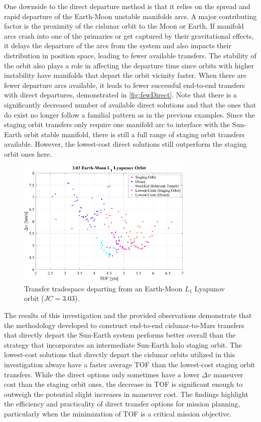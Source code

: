 One downside to the direct departure method is that it relies on the spread and rapid departure of
the Earth-Moon unstable manifolds arcs. A major contributing factor is the proximity of the
cislunar orbit to the Moon or Earth. If manifold arcs crash into one of the primaries or get
captured by their gravitational effects, it delays the departure of the arcs from the system and
also impacts their distribution in position space, leading to fewer available transfers. The
stability of the orbit also plays a role in affecting the departure time since orbits with higher
instability have manifolds that depart the orbit vicinity faster. When there are fewer departure
arcs available, it leads to fewer successful end-to-end transfers with direct departures,
demonstrated in \cref{fig:fewDirect}. Note that there is a significantly decreased number of
available direct solutions and that the ones that do exist no longer follow a familial pattern as
in the previous examples. Since the staging orbit transfers only require one manifold arc to
interface with the Sun-Earth orbit stable manifold, there is still a full range of staging orbit
transfers available. However, the lowest-cost direct solutions still outperform the staging orbit
ones here.

\begin{figure}[H]
    \centering
    \includegraphics[width=0.75\textwidth]{figures/TradeSpace_L1Lyapunov_3_03.pdf}
    \caption{Transfer tradespace departing from an Earth-Moon $L_{1}$ Lyapunov orbit ($JC=3.03$).}
    \label{fig:lowBoth}
\end{figure}

The results of this investigation and the provided observations demonstrate that the methodology
developed to construct end-to-end cislunar-to-Mars transfers that directly depart the Sun-Earth
system performs better overall than the strategy that incorporates an intermediate Sun-Earth halo
staging orbit. The lowest-cost solutions that directly depart the cislunar orbits utilized in this
investigation always have a faster average TOF than the lowest-cost staging orbit transfers. While
the direct options only sometimes have a lower $\Delta v$ maneuver cost than the staging orbit
ones, the decrease in TOF is significant enough to outweigh the potential slight increases in
maneuver cost. The findings highlight the efficiency and practicality of direct transfer options
for mission planning, particularly when the minimization of TOF is a critical mission objective.

